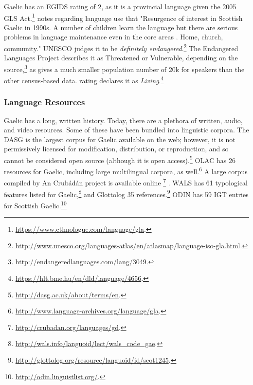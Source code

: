 Gaelic has an EGIDS rating of 2, as it is a provincial language given the 2005 GLS Act.\footnote{\href{https://www.ethnologue.com/language/gla}{https://www.ethnologue.com/language/gla}. }  \citet{lewis2009ethnologue} notes regarding language use that "Resurgence of interest in Scottish Gaelic in 1990s. A number of children learn the language but there are serious problems in language maintenance even in the core areas \citep{salminen2007endangered}. Home, church, community." UNESCO judges it to be {\it definitely endangered}.\footnote{\href{http://www.unesco.org/languages-atlas/en/atlasmap/language-iso-gla.html}{http://www.unesco.org/languages-atlas/en/atlasmap/language-iso-gla.html}. } The Endangered Languages Project describes it as Threatened or Vulnerable, depending on the source,\footnote{\href{http://endangeredlanguages.com/lang/3049}{http://endangeredlanguages.com/lang/3049}. } as \citet{salminen2007europe} gives a much smaller population number of 20k for speakers than the other census-based data.  rating declares it as {\it Living}.\footnote{\href{https://hlt.bme.hu/en/dld/language/4656}{https://hlt.bme.hu/en/dld/language/4656}. }

\subsubsection{Language Resources}
\label{subsec:gaelic-resources}

Gaelic has a long, written history. Today, there are a plethora of written, audio, and video resources. Some of these have been bundled into linguistic corpora. The DASG is the largest corpus for Gaelic available on the web; however, it is not permissively licensed for modification, distribution, or reproduction, and so cannot be considered open source (although it is open access).\footnote{\href{http://dasg.ac.uk/about/terms/en}{http://dasg.ac.uk/about/terms/en}. } OLAC has 26 resources for Gaelic, including large multilingual corpora, as well.\footnote{\href{http://www.language-archives.org/language/gla}{http://www.language-archives.org/language/gla}. } A large corpus compiled by An Crub\'ad\'an project is available online \footnote{\href{http://crubadan.org/languages/gd}{http://crubadan.org/languages/gd}. } \citep{scannell2007crubadan}. WALS has 61 typological features listed for Gaelic,\footnote{\href{http://wals.info/languoid/lect/wals_code_gae}{http://wals.info/languoid/lect/wals\_code\_gae}. } and Glottolog 35 references.\footnote{\href{http://glottolog.org/resource/languoid/id/scot1245}{http://glottolog.org/resource/languoid/id/scot1245}. } ODIN has 59 IGT entries for Scottish Gaelic.\footnote{\href{http://odin.linguistlist.org/}{http://odin.linguistlist.org/}. }

